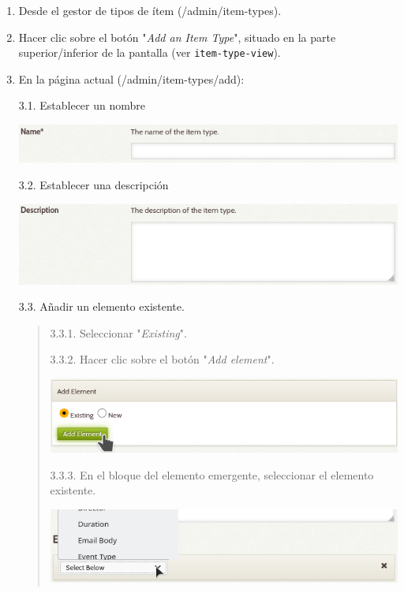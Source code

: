 \documentclass[
]{article}
\begin{document}
\begin{enumerate}
\def\labelenumi{\arabic{enumi}.}
\item
  Desde el gestor de tipos de ítem ({/admin/item-types}).
\item
  Hacer clic sobre el botón "\emph{Add an Item Type}", situado en la
  parte superior/inferior de la pantalla (ver \texttt{item-type-view}).
\item
  En la página actual ({/admin/item-types/add}):

  3.1. Establecer un nombre

  \includegraphics{../_static/images/name-item-type.png}

  3.2. Establecer una descripción

  \includegraphics{../_static/images/desc-item-type.png}

  3.3. Añadir un elemento existente.

  \begin{quote}
  3.3.1. Seleccionar "\emph{Existing}".

  3.3.2. Hacer clic sobre el botón "\emph{Add element}".

  \includegraphics{../_static/images/exi-item-type-1.png}

  3.3.3. En el bloque del elemento emergente, seleccionar el elemento
  existente.

  \includegraphics{../_static/images/exi-item-type-2.png}
  \end{quote}


\end{enumerate}
\end{document}
